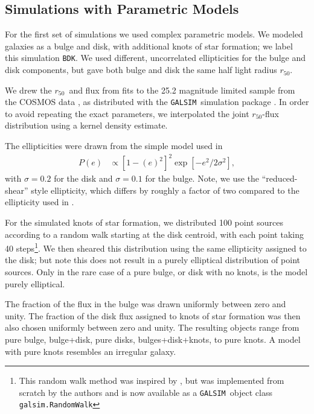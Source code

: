 \documentclass[iop]{emulateapj}
\newcommand{\hlr}{$r_{50}$}
\newcommand{\bdsim}{\texttt{BDK}}
\newcommand{\galsim}{\texttt{GALSIM}}
\begin{document}
\subsection{Simulations with Parametric Models} \label{sec:bdsim}

For the first set of
simulations we used complex parametric models.  We modeled galaxies as a bulge
and disk, with additional knots of star formation; we label this simulation
\bdsim.  We used different, uncorrelated ellipticities for the bulge and disk
components, but gave both bulge and disk the same half light radius \hlr.

We drew the \hlr\ and flux from fits \citep{LacknerGunn2012} to the 25.2
magnitude limited sample from the COSMOS data
\citep{Scoville2007a,Scoville2007b}, as distributed with the \galsim\
simulation package \citep{GALSIM2015}.  In order to avoid repeating the exact
parameters, we interpolated the joint \hlr-flux distribution using a kernel
density estimate.

The ellipticities were drawn from the simple model used in \cite{bfd2016}
\begin{align} \label{eq:edist}
    P(e) &\propto \left[1-(e)^2\right]^2 \exp\left[-e^2/2\sigma^2\right],
\end{align}
with $\sigma=0.2$ for the disk and $\sigma=0.1$ for the bulge.  Note, we use
the ``reduced-shear'' style ellipticity, which differs by roughly a factor of
two compared to the ellipticity used in \citet{bfd2016}.

For the simulated knots of star formation, we distributed 100 point sources
according to a random walk starting at the disk centroid, with each point
taking 40 steps\footnote{This random walk method was inspired by
\cite{Zhang2008FourierQuadI}, but was implemented from scratch by the authors
and is now available as a \galsim\ object class \texttt{galsim.RandomWalk}}.
We then sheared this distribution using the same ellipticity assigned to the
disk; but note this does not result in a purely elliptical distribution of
point sources.  Only in the rare case of a pure bulge, or disk with no knots,
is the model purely elliptical.

The fraction of the flux in the bulge was drawn uniformly between zero and
unity.  The fraction of the disk flux assigned to knots of star formation
was then also chosen uniformly between zero and unity.  The resulting 
objects range from pure bulge, bulge+disk, pure disks, bulges+disk+knots, 
to pure knots. A model with pure knots resembles an irregular galaxy.
\end{document}
